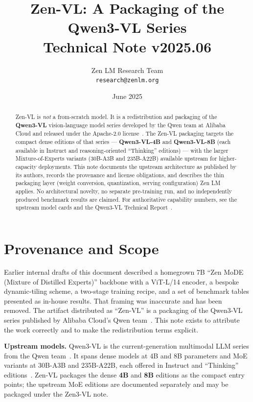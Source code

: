 \documentclass[11pt,a4paper]{article}
\title{\textbf{Zen-VL: A Packaging of the Qwen3-VL Series}\\
\large Technical Note v2025.06}
\author{Zen LM Research Team\\
\texttt{research@zenlm.org}}
\date{June 2025}
\begin{document}
\maketitle

\begin{abstract}
Zen-VL is \emph{not} a from-scratch model. It is a redistribution and packaging of the
\textbf{Qwen3-VL} vision-language model series developed by the Qwen team at Alibaba Cloud
and released under the Apache-2.0 license~\cite{qwen3vl}. The Zen-VL packaging targets the
compact dense editions of that series --- \textbf{Qwen3-VL-4B} and \textbf{Qwen3-VL-8B}
(each available in Instruct and reasoning-oriented ``Thinking'' editions) --- with the
larger Mixture-of-Experts variants (30B-A3B and 235B-A22B) available upstream for
higher-capacity deployments. This note documents the upstream architecture as published by
its authors, records the provenance and license obligations, and describes the thin
packaging layer (weight conversion, quantization, serving configuration) Zen LM applies. No
architectural novelty, no separate pre-training run, and no independently produced benchmark
results are claimed. For authoritative capability numbers, see the upstream model cards and
the Qwen3-VL Technical Report~\cite{qwen3vl,qwen3vl4b,qwen3vlreport}.
\end{abstract}

\tableofcontents
\newpage

\section{Provenance and Scope}

Earlier internal drafts of this document described a homegrown 7B ``Zen MoDE (Mixture of
Distilled Experts)'' backbone with a ViT-L/14 encoder, a bespoke dynamic-tiling scheme,
a two-stage training recipe, and a set of benchmark tables presented as in-house results.
That framing was inaccurate and has been removed. The artifact distributed as ``Zen-VL'' is
a packaging of the Qwen3-VL series published by Alibaba Cloud's Qwen team~\cite{qwen3vl}.
This note exists to attribute the work correctly and to make the redistribution terms
explicit.

\textbf{Upstream models.} Qwen3-VL is the current-generation multimodal LLM series from the
Qwen team~\cite{qwen3vlreport}. It spans dense models at 4B and 8B parameters and MoE
variants at 30B-A3B and 235B-A22B, each offered in Instruct and ``Thinking''
editions~\cite{qwen3vl4b}. Zen-VL packages the dense \textbf{4B} and \textbf{8B} editions as
the compact entry points; the upstream MoE editions are documented separately and may be
packaged under the Zen3-VL note.
\end{document}
